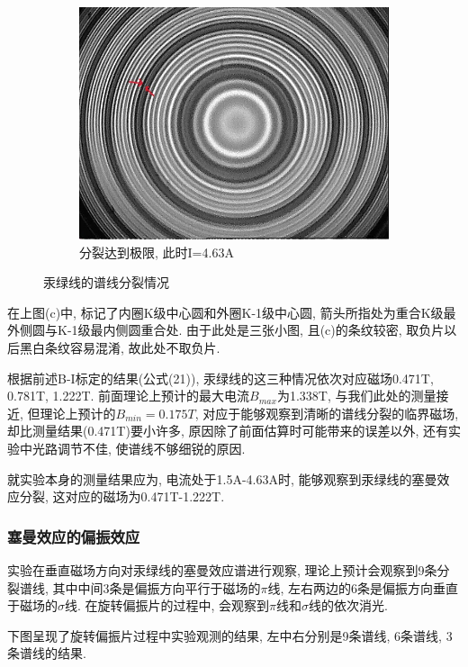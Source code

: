 \documentclass[12pt,a4paper]{article}
\begin{document}
\begin{figure}[H]
\begin{subfigure}[b]{0.3\textwidth}
      \includegraphics[width=\textwidth]{MultiRings@4.63A.jpg}
      \caption{分裂达到极限, 此时I=4.63A}
    \end{subfigure}
    \caption{汞绿线的谱线分裂情况}
  \end{figure}

在上图(c)中, 标记了内圈K级中心圆和外圈K-1级中心圆, 箭头所指处为重合K级最外侧圆与K-1级最内侧圆重合处. 由于此处是三张小图, 且(c)的条纹较密, 
取负片以后黑白条纹容易混淆, 故此处不取负片. 

根据前述B-I标定的结果(公式(21)), 汞绿线的这三种情况依次对应磁场0.471T, 0.781T, 1.222T. 前面理论上预计的最大电流$B_{max}$为1.338T, 与我们此处的测量接近, 
但理论上预计的$B_{min}=0.175T$, 对应于能够观察到清晰的谱线分裂的临界磁场, 却比测量结果(0.471T)要小许多, 原因除了前面估算时可能带来的误差以外, 还有实验中光路调节不佳, 使谱线不够细锐的原因. 

就实验本身的测量结果应为, 电流处于1.5A-4.63A时, 能够观察到汞绿线的塞曼效应分裂, 这对应的磁场为0.471T-1.222T. 

\subsubsection{塞曼效应的偏振效应}
实验在垂直磁场方向对汞绿线的塞曼效应谱进行观察, 理论上预计会观察到9条分裂谱线, 其中中间3条是偏振方向平行于磁场的$\pi$线, 左右两边的6条是偏振方向垂直于磁场的$\sigma$线. 
在旋转偏振片的过程中, 会观察到$\pi$线和$\sigma$线的依次消光. 

下图呈现了旋转偏振片过程中实验观测的结果, 左中右分别是9条谱线, 6条谱线, 3条谱线的结果. 
\end{document}
